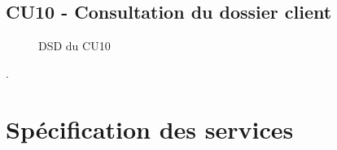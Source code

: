 \subsection{CU10 - Consultation du dossier client}
\begin{figure}[H]
\noindent{}
\caption{DSD du CU10}
\end{figure}


.
\section{Spécification des services}
